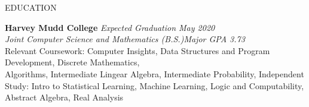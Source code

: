 \documentclass{resume} %
\begin{document}

\begin{rSection}{EDUCATION}

{\bf Harvey Mudd College} \hfill {\em Expected Graduation May 2020} \\
{\em Joint Computer Science and Mathematics (B.S.)}\hfill {\em Major GPA 3.73} \\
Relevant Coursework: Computer Insights, Data Structures and Program Development, Discrete Mathematics, \\Algorithms, Intermediate Lingear Algebra, Intermediate Probability, Independent Study: Intro to Statistical Learning, Machine Learning, Logic and Computability, Abstract Algebra, Real Analysis
\end{rSection}
\end{document}
